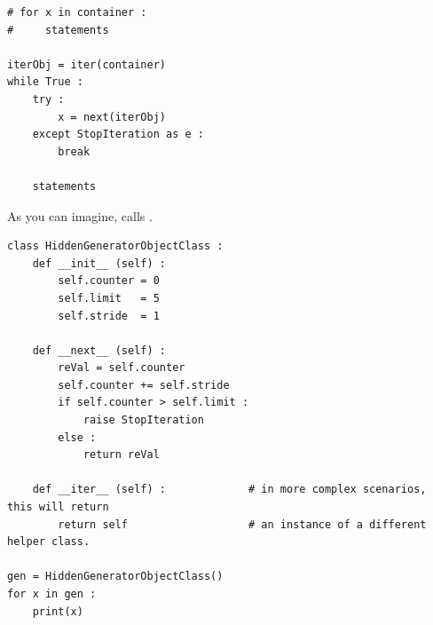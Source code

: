 
\begin{frame}[fragile]
%
\begin{codebox}
\begin{verbatim}
# for x in container :
#     statements

iterObj = iter(container)
while True :
    try :
        x = next(iterObj)
    except StopIteration as e :
        break
    
    statements
\end{verbatim}
\end{codebox}
%
As you can imagine,  calls .
%
\end{frame}


\begin{frame}[fragile]
%
\begin{codebox}
\begin{verbatim}
class HiddenGeneratorObjectClass :
    def __init__ (self) :
        self.counter = 0
        self.limit   = 5
        self.stride  = 1
    
    def __next__ (self) :
        reVal = self.counter
        self.counter += self.stride
        if self.counter > self.limit :
            raise StopIteration
        else :
            return reVal

    def __iter__ (self) :             # in more complex scenarios, this will return
        return self                   # an instance of a different helper class.

gen = HiddenGeneratorObjectClass()
for x in gen :
    print(x)
\end{verbatim}
\end{codebox}
%
\end{frame}



